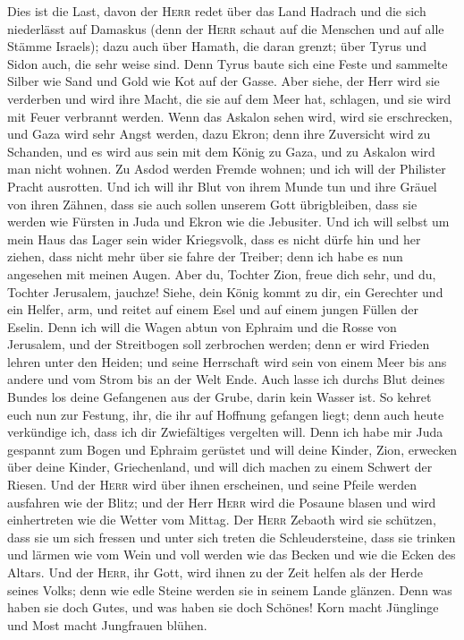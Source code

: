 Dies ist die Last, davon der \textsc{Herr} redet über das
Land Hadrach und die sich niederlässt auf Damaskus (denn der
\textsc{Herr} schaut auf die Menschen und auf alle Stämme Israels);
 dazu auch über Hamath, die daran grenzt; über Tyrus und
Sidon auch, die sehr weise sind.  Denn Tyrus baute sich
eine Feste und sammelte Silber wie Sand und Gold wie Kot auf der Gasse.
 Aber siehe, der Herr wird sie verderben und wird ihre
Macht, die sie auf dem Meer hat, schlagen, und sie wird mit Feuer
verbrannt werden.  Wenn das Askalon sehen wird, wird sie
erschrecken, und Gaza wird sehr Angst werden, dazu Ekron; denn ihre
Zuversicht wird zu Schanden, und es wird aus sein mit dem König zu Gaza,
und zu Askalon wird man nicht wohnen.  Zu Asdod werden
Fremde wohnen; und ich will der Philister Pracht ausrotten.
 Und ich will ihr Blut von ihrem Munde tun und ihre Gräuel
von ihren Zähnen, dass sie auch sollen unserem Gott übrigbleiben, dass
sie werden wie Fürsten in Juda und Ekron wie die Jebusiter.
 Und ich will selbst um mein Haus das Lager sein wider
Kriegsvolk, dass es nicht dürfe hin und her ziehen, dass nicht mehr über
sie fahre der Treiber; denn ich habe es nun angesehen mit meinen Augen.
 Aber du, Tochter Zion, freue dich sehr, und du, Tochter
Jerusalem, jauchze! Siehe, dein König kommt zu dir, ein Gerechter und
ein Helfer, arm, und reitet auf einem Esel und auf einem jungen Füllen
der Eselin.  Denn ich will die Wagen abtun von Ephraim
und die Rosse von Jerusalem, und der Streitbogen soll zerbrochen werden;
denn er wird Frieden lehren unter den Heiden; und seine Herrschaft wird
sein von einem Meer bis ans andere und vom Strom bis an der Welt Ende.
 Auch lasse ich durchs Blut deines Bundes los deine
Gefangenen aus der Grube, darin kein Wasser ist.  So
kehret euch nun zur Festung, ihr, die ihr auf Hoffnung gefangen liegt;
denn auch heute verkündige ich, dass ich dir Zwiefältiges vergelten
will.  Denn ich habe mir Juda gespannt zum Bogen und
Ephraim gerüstet und will deine Kinder, Zion, erwecken über deine
Kinder, Griechenland, und will dich machen zu einem Schwert der Riesen.
 Und der \textsc{Herr} wird über ihnen erscheinen, und
seine Pfeile werden ausfahren wie der Blitz; und der Herr \textsc{Herr}
wird die Posaune blasen und wird einhertreten wie die Wetter vom Mittag.
 Der \textsc{Herr} Zebaoth wird sie schützen, dass sie um
sich fressen und unter sich treten die Schleudersteine, dass sie trinken
und lärmen wie vom Wein und voll werden wie das Becken und wie die Ecken
des Altars.  Und der \textsc{Herr}, ihr Gott, wird ihnen
zu der Zeit helfen als der Herde seines Volks; denn wie edle Steine
werden sie in seinem Lande glänzen.  Denn was haben sie
doch Gutes, und was haben sie doch Schönes! Korn macht Jünglinge und
Most macht Jungfrauen blühen.

